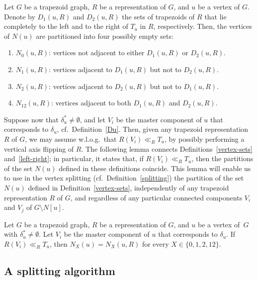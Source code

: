 \documentclass[proceedings]{stacs}
\begin{document}
\begin{definition}
\label{left-right}Let $G$ be a trapezoid graph, $R$ be a representation of $%
G $, and $u$ be a vertex of $G$. Denote by $D_{1}(u,R)$ and $D_{2}(u,R)$ the
sets of trapezoids of $R$ that lie completely to the left and to the right
of $T_{u}$ in $R$, respectively. Then, the vertices of $N(u)$ are
partitioned into four possibly empty sets:
\begin{enumerate}
\item $N_{0}(u,R)$: vertices not adjacent to either $D_{1}(u,R)$ or $D_{2}(u,R)$.
\item $N_{1}(u,R)$: vertices adjacent to $D_{1}(u,R)$ but not to $D_{2}(u,R)$.
\item $N_{2}(u,R)$: vertices adjacent to $D_{2}(u,R)$ but not to $D_{1}(u,R)$.
\item $N_{12}(u,R)$: vertices adjacent to both $D_{1}(u,R)$ and $D_{2}(u,R)$.
\end{enumerate}
\end{definition}

Suppose now that $\delta_{u}^{\ast} \neq \emptyset$, and let $V_{i}$ be the master component of $u$ that 
corresponds to $\delta_{u}$, cf.~Definition~\ref{Du}. 
Then, given any trapezoid representation $R$ of $G$, we may assume w.l.o.g.~that $R(V_{i}){\ll }_{R}{T_{u}}$, 
by possibly performing a vertical axis flipping of $R$.
The following lemma connects Definitions~\ref{vertex-sets} and~\ref{left-right}; 
in particular, it states that, if $R(V_{i}) \ll_{R} T_{u}$, then the partitions of the set $N(u)$ defined in 
these definitions coincide. 
This lemma will enable us to use in the vertex splitting (cf.~Definition~\ref{splitting}) 
the partition of the set $N(u)$ defined in Definition~\ref{vertex-sets}, 
independently of any trapezoid representation $R$ of $G$, and regardless of any particular 
connected components $V_{i}$ and $V_{j}$ of $G\setminus N[u]$.


\begin{lemma}
\label{separation-corollary}Let $G$ be a trapezoid graph, $R$ be a representation of $G$, 
and $u$ be a vertex of~$G$ with ${\delta_{u}^{\ast}\neq \emptyset}$. 
Let $V_{i}$ be the master component of $u$ that corresponds to $\delta_{u}$. 
If ${R(V_{i}){\ll }_{R}{T_{u}}}$, then ${N_{X}(u)=N_{X}(u,R)}$ for every $X\in \{0,1,2,12\}$.
\end{lemma}

\subsection{A splitting algorithm\label{splitting-algorithm}}
\end{document}
